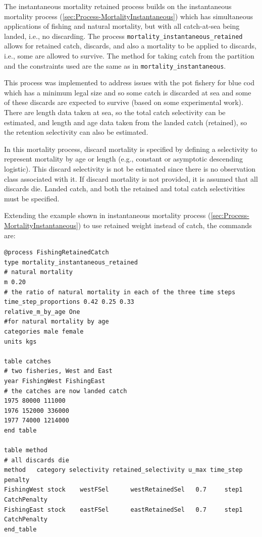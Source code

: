 The instantaneous mortality retained process builds on the instantaneous mortality process (\ref{sec:Process-MortalityInstantaneous}) which has simultaneous applications of fishing and natural mortality, but with all catch-at-sea being landed, i.e., no discarding. The process \texttt{mortality\_instantaneous\_retained} allows for retained catch, discards, and also a mortality to be applied to discards, i.e., some are allowed to survive. The method for taking catch from the partition and the constraints used are the same as in \texttt{mortality\_instantaneous}.

This process was implemented to address issues with the pot fishery for blue cod which has a minimum legal size and so some catch is discarded at sea and some of these discards are expected to survive (based on some experimental work). There are length data taken at sea, so the total catch selectivity can be estimated, and length and age data taken from the landed catch (retained), so the retention selectivity can also be estimated.

In this mortality process, discard mortality is specified by defining a selectivity to represent mortality by age or length (e.g., constant or asymptotic descending logistic).  This discard selectivity is not be estimated since there is no observation class associated with it. If discard mortality is not provided, it is assumed that all discards die. Landed catch, and both the retained and total catch selectivities must be specified.

Extending the example shown in instantaneous mortality process (\ref{sec:Process-MortalityInstantaneous}) to use retained weight instead of catch, the commands are:

{\small{\begin{verbatim}
@process FishingRetainedCatch
type mortality_instantaneous_retained
# natural mortality
m 0.20
# the ratio of natural mortality in each of the three time steps
time_step_proportions 0.42 0.25 0.33
relative_m_by_age One
#for natural mortality by age
categories male female
units kgs

table catches
# two fisheries, West and East
year FishingWest FishingEast
# the catches are now landed catch
1975 80000 111000
1976 152000 336000
1977 74000 1214000
end table

table method
# all discards die
method   category selectivity retained_selectivity u_max time_step      penalty
FishingWest stock    westFSel      westRetainedSel   0.7     step1 CatchPenalty
FishingEast stock    eastFSel      eastRetainedSel   0.7     step1 CatchPenalty
end_table
\end{verbatim}}}

